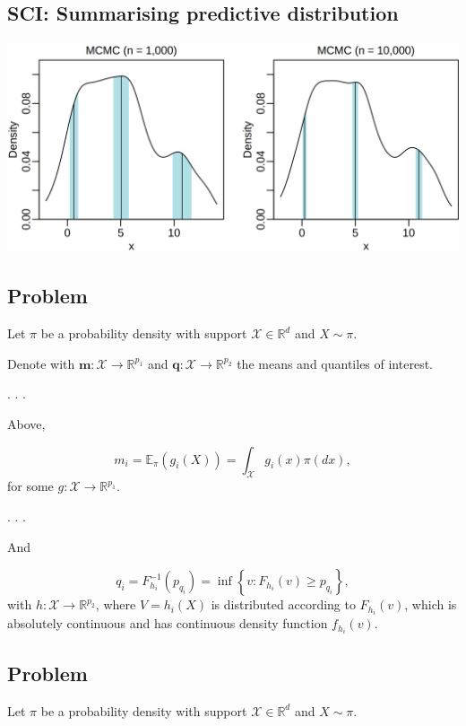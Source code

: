 \documentclass[
  letterpaper,
  DIV=11,
  numbers=noendperiod]{scrartcl}
\begin{document}
\hypertarget{sci-summarising-predictive-distribution}{%
\subsection{SCI: Summarising predictive
distribution}\label{sci-summarising-predictive-distribution}}

\includegraphics{mixture2.png}

\hypertarget{problem}{%
\subsection{Problem}\label{problem}}

Let \(\pi\) be a probability density with support
\(\mathcal X \in \mathbb R^d\) and \(X\sim \pi\).

Denote with \(\mathbf{m}:\mathcal X \to \mathbb R^{p_1}\) and
\(\mathbf{q} : \mathcal X \to \mathbb R ^{p_2}\) the means and quantiles
of interest.

. . .

Above,

\[ m_i = \mathbb E_\pi\left(g_i(X)\right) = \int_{\mathcal X}g_i(x)\pi(dx),\]
for some \(g:\mathcal X \to \mathbb R^{p_1}\).

. . .

And

\[ q_i = F_{h_i}^{-1}(p_{q_i}) = \inf\left\lbrace v : F_{h_i}(v)\geq p_{q_i}\right\rbrace,\]
with \(h:\mathcal X \to \mathbb R^{p_2}\), where \(V = h_i(X)\) is
distributed according to \(F_{h_i}(v)\), which is absolutely continuous
and has continuous density function \(f_{h_i}(v)\).

\hypertarget{problem-1}{%
\subsection{Problem}\label{problem-1}}

Let \(\pi\) be a probability density with support
\(\mathcal X \in \mathbb R^d\) and \(X\sim \pi\).
\end{document}
